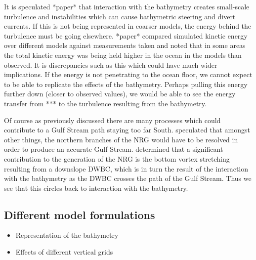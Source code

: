 \documentclass[a4paper,11pt]{article}
\begin{document}
It is speculated *paper* that interaction with the bathymetry creates small-scale turbulence and instabilities which can cause bathymetric steering and divert currents. If this is not being represented in coarser models, the energy behind the turbulence must be going elsewhere. *paper* compared simulated kinetic energy over different models against measurements taken and noted that in some areas the total kinetic energy was being held higher in the ocean in the models than observed. It is discrepancies  such as this which could have much wider implications. If the energy is not penetrating to the ocean floor, we cannot expect to be able to replicate the effects of the bathymetry. Perhaps pulling this energy further down (closer to observed values), we would be able to see the energy transfer from *** to the turbulence resulting from the bathymetry. 

Of course as previously discussed there are many processes which could contribute to a Gulf Stream path staying too far South. \citep{Ezer2016b} speculated that amongst other things, the northern branches of the NRG would have to be resolved in order to produce an accurate Gulf Stream. \citep{Zhang2007} determined that a significant contribution to the generation of the NRG is the bottom vortex stretching resulting from a downslope DWBC, which is in turn the result of the interaction with the bathymetry as the DWBC crosses the path of the Gulf Stream. Thus we see that this circles back to interaction with the bathymetry.


\subsection{Different model formulations}
\begin{itemize}
  \item Representation of the bathymetry
  \item Effects of different vertical grids
\end{itemize}
\end{document}
